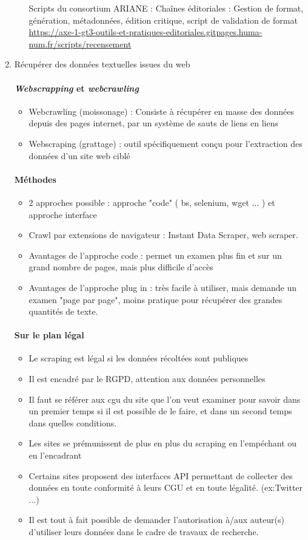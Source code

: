 \documentclass{book}
\newenvironment{titlemize}[1]{%
  \paragraph{#1}
  \begin{itemize}}
  {\end{itemize}}
\begin{document}
\begin{enumerate}
\begin{enumerate}
            \item [Scripts du consortium ARIANE] : Chaînes éditoriales : Gestion de format, génération, métadonnées, édition critique, script de validation de format \url{https://axe-1-gt3-outils-et-pratiques-editoriales.gitpages.huma-num.fr/scripts/recensement}
        \end{enumerate}
    \item Récupérer des données textuelles issues du web
        \begin{titlemize}{\textit{Webscrapping} et \textit{webcrawling}}
            \item Webcrawling (moissonage) : Consiste à récupérer en masse des données depuis des pages internet, par un système de sauts de liens en liens
            \item Webscraping (grattage) : outil spécifiquement conçu pour l'extraction des données d'un site web ciblé
        \end{titlemize}
        \begin{titlemize}{Méthodes}
             \item 2 approches possible : approche "code" ( bs, selenium, wget ... ) et approche interface 
            \item Crawl par extensions de navigateur : Instant Data Scraper, web scraper.
            \item Avantages de l'approche code : permet un examen plus fin et sur un grand nombre de pages, mais plus difficile d'accès
            \item Avantages de l'approche plug in : très facile à utiliser, mais demande un examen "page par page", moins pratique pour récupérer des grandes quantités de texte.
        \end{titlemize}
        \begin{titlemize}{Sur le plan légal}
            \item Le scraping est légal si les données récoltées sont publiques
            \item Il est encadré par le RGPD, attention aux données personnelles
            \item Il faut se référer aux \gls{cgu} du site que l'on veut examiner pour savoir dans un premier temps si il est possible de le faire, et dans un second temps dans quelles conditions.
            \item Les sites se prémunissent de plus en plus du scraping en l'empéchant ou en l'encadrant
            \item Certains sites proposent des interfaces API permettant de collecter des données en toute conformité à leurs CGU et en toute légalité. (ex:Twitter ...)
            \item Il est tout à fait possible de demander l'autorisation à/aux auteur(s) d'utiliser leurs données dans le cadre de travaux de recherche.
        \end{titlemize}
\end{enumerate}
\end{document}
